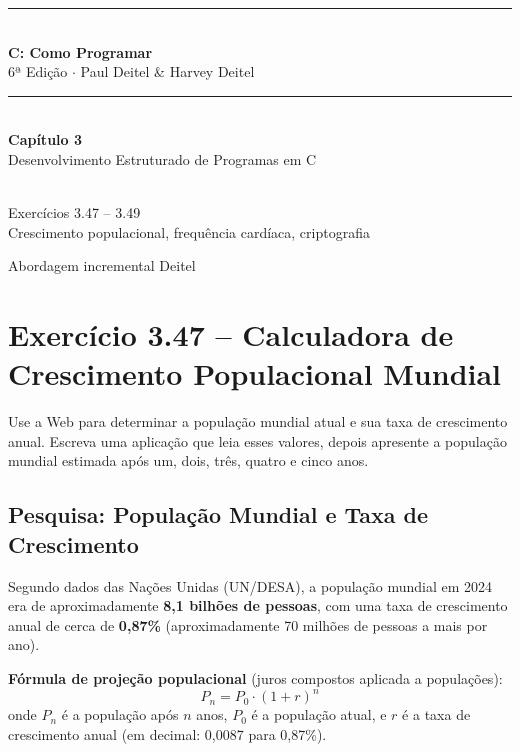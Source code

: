 \documentclass[12pt,a4paper]{article}
\begin{document}
\begin{titlepage}
  \centering\vspace*{2cm}
  {\color{deitelblue}\rule{\linewidth}{2pt}}\\[0.4cm]
  {\huge\bfseries\color{deitelblue}C: Como Programar}\\[0.2cm]
  {\large\color{deitelblue}6ª Edição $\cdot$ Paul Deitel \& Harvey Deitel}\\[0.2cm]
  {\color{deitelblue}\rule{\linewidth}{2pt}}\\[1cm]
  {\LARGE\bfseries Capítulo 3}\\[0.3cm]
  {\Large\color{deitelblue!80}Desenvolvimento Estruturado de Programas em C}\\[0.8cm]
  \begin{tcolorbox}[colback=ecolightgreen,colframe=ecogreen,width=0.85\linewidth]
    \\[0.3cm]
    {\normalsize Exercícios 3.47 -- 3.49\\[0.2cm]
    Crescimento populacional, frequência cardíaca, criptografia}
  \end{tcolorbox}
  \vfill{\small Abordagem incremental Deitel}
\end{titlepage}

\tableofcontents\newpage

\section{Exercício 3.47 -- Calculadora de Crescimento Populacional Mundial}

\begin{enunciadoBox}[Enunciado 3.47]
Use a Web para determinar a população mundial atual e sua taxa de crescimento anual.
Escreva uma aplicação que leia esses valores, depois apresente a população mundial
estimada após um, dois, três, quatro e cinco anos.
\end{enunciadoBox}

\subsection*{Pesquisa: População Mundial e Taxa de Crescimento}

\begin{pesquisa}
Segundo dados das Nações Unidas (UN/DESA), a população mundial em 2024 era de
aproximadamente \textbf{8,1 bilhões de pessoas}, com uma taxa de crescimento anual
de cerca de \textbf{0,87\%} (aproximadamente 70 milhões de pessoas a mais por ano).

\textbf{Fórmula de projeção populacional} (juros compostos aplicada a populações):
\[
  P_n = P_0 \cdot (1 + r)^n
\]
onde $P_n$ é a população após $n$ anos, $P_0$ é a população atual, e $r$ é a taxa
de crescimento anual (em decimal: 0,0087 para 0,87\%).
\end{pesquisa}
\end{document}
